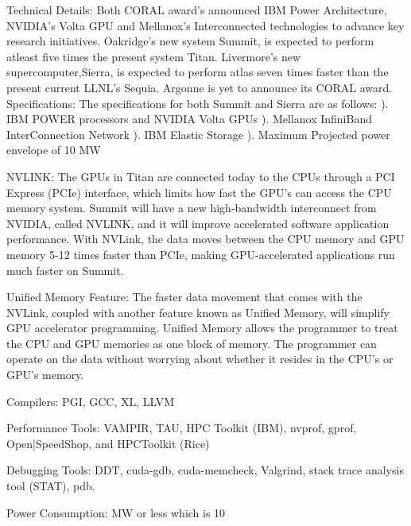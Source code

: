 \documentclass[fleqn,letterpaper,12pt]{report}
\begin{document}
Technical Details: \newline
Both CORAL award’s announced IBM Power Architecture, NVIDIA’s Volta GPU and Mellanox’s Interconnected technologies to advance key research initiatives. Oakridge’s new system Summit, is expected to perform atleast five times the present system Titan. Livermore’s new supercomputer,Sierra, is expected to perform atlas seven times faster than the present current LLNL’s Sequia.
Argonne is yet to announce its CORAL award.
\newpage
Specifications:\cite{Sierra}\newline
The specifications for both Summit and Sierra are as follows: ). IBM POWER processors and NVIDIA Volta GPUs ). Mellanox InfiniBand InterConnection Network ). IBM Elastic Storage ). Maximum Projected power envelope of 10 MW 

NVLINK: \newline
The GPUs in Titan are connected today to the CPUs through a PCI Express (PCIe) interface, which limits how fast the GPU’s can access the CPU memory system. Summit will have a new high-bandwidth interconnect from NVIDIA, called NVLINK, and it will improve accelerated software application performance. With NVLink, the data moves between the CPU memory and GPU memory 5-12 times faster than PCIe, making GPU-accelerated applications run much faster on Summit. 

Unified Memory Feature: \newline
The faster data movement that comes with the NVLink, coupled with another feature known as Unified Memory, will simplify GPU accelerator programming. Unified Memory allows the programmer to treat the CPU and GPU memories as one block of memory. The programmer can operate on the data without worrying about whether it resides in the CPU’s or GPU’s memory.

Compilers: \newline
PGI, GCC, XL, LLVM 

Performance Tools: \newline
VAMPIR, TAU, HPC Toolkit (IBM), nvprof, gprof, Open|SpeedShop, and HPCToolkit (Rice) 

Debugging Tools: \newline
DDT, cuda-gdb, cuda-memcheck, Valgrind, stack trace analysis tool (STAT), pdb.

Power Consumption:  MW or less which is 10%
\end{document}
